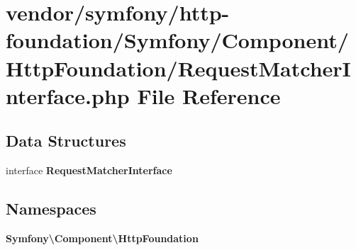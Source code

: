 \section{vendor/symfony/http-\/foundation/\+Symfony/\+Component/\+Http\+Foundation/\+Request\+Matcher\+Interface.php File Reference}
\label{http-foundation_2_symfony_2_component_2_http_foundation_2_request_matcher_interface_8php}
\subsection*{Data Structures}
\begin{DoxyCompactItemize}
\item 
interface {\bf Request\+Matcher\+Interface}
\end{DoxyCompactItemize}
\subsection*{Namespaces}
\begin{DoxyCompactItemize}
\item 
 {\bf Symfony\textbackslash{}\+Component\textbackslash{}\+Http\+Foundation}
\end{DoxyCompactItemize}
